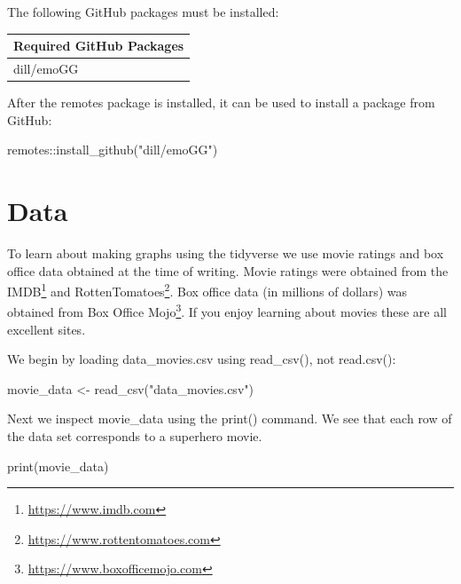 \documentclass[
]{krantz}
\makeatletter
\newenvironment{Shaded}{\begin{snugshade}}{\end{snugshade}}
\newcommand{\FunctionTok}[1]{\textcolor[rgb]{0,0,0}{#1}}
\newcommand{\NormalTok}[1]{#1}
\newcommand{\OtherTok}[1]{\textcolor[rgb]{0.37,0.37,0.37}{#1}}
\newcommand{\SpecialCharTok}[1]{\textcolor[rgb]{0,0,0}{#1}}
\newcommand{\StringTok}[1]{\textcolor[rgb]{0.5,0.5,0.5}{#1}}
\renewcommand{\href}[2]{#2\footnote{\url{#1}}}
\newenvironment{kframe}{%
\medskip{}
\setlength{\fboxsep}{.8em}
 \def\at@end@of@kframe{}%
 \ifinner\ifhmode%
  \def\at@end@of@kframe{\end{minipage}}%
  \begin{minipage}{\columnwidth}%
 \fi\fi%
 \def\FrameCommand##1{\hskip\@totalleftmargin \hskip-\fboxsep
 \colorbox{shadecolor}{##1}\hskip-\fboxsep
     \hskip-\linewidth \hskip-\@totalleftmargin \hskip\columnwidth}%
 \MakeFramed {\advance\hsize-\width
   \@totalleftmargin\z@ \linewidth\hsize
   \@setminipage}}%
 {\par\unskip\endMakeFramed%
 \at@end@of@kframe}
\renewenvironment{Shaded}{\begin{kframe}}{\end{kframe}}
\makeatother
\begin{document}
The following GitHub packages must be installed:

\begin{longtable}[]{@{}l@{}}
\toprule
Required GitHub Packages \\
\midrule
\endhead
dill/emoGG \\
\bottomrule
\end{longtable}

After the remotes package is installed, it can be used to install a package from GitHub:

\begin{Shaded}
\begin{Highlighting}[]
\NormalTok{remotes}\SpecialCharTok{::}\FunctionTok{install\_github}\NormalTok{(}\StringTok{"dill/emoGG"}\NormalTok{)}
\end{Highlighting}
\end{Shaded}

\hypertarget{data}{%
\section{Data}\label{data}}

To learn about making graphs using the tidyverse we use movie ratings and box office data obtained at the time of writing. Movie ratings were obtained from the \href{https://www.imdb.com}{IMDB} and \href{https://www.rottentomatoes.com}{RottenTomatoes}. Box office data (in millions of dollars) was obtained from \href{https://www.boxofficemojo.com}{Box Office Mojo}. If you enjoy learning about movies these are all excellent sites.

We begin by loading data\_movies.csv using read\_csv(), not read.csv():

\begin{Shaded}
\begin{Highlighting}[]
\NormalTok{movie\_data }\OtherTok{\textless{}{-}} \FunctionTok{read\_csv}\NormalTok{(}\StringTok{"data\_movies.csv"}\NormalTok{)}
\end{Highlighting}
\end{Shaded}

Next we inspect movie\_data using the print() command. We see that each row of the data set corresponds to a superhero movie.

\begin{Shaded}
\begin{Highlighting}[]
\FunctionTok{print}\NormalTok{(movie\_data)}
\end{Highlighting}
\end{Shaded}
\end{document}
